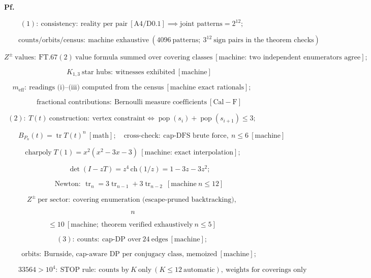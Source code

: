 \begin{theorem}
\textbf{Pf.}

\[
(1):\ \text{consistency}:\ \text{reality per pair}\ [\mathrm{A4}/\mathrm{D0.1}]\implies\text{joint patterns}=2^{12};
\]

\[
\qquad \text{counts/orbits/census}:\ \text{machine exhaustive}\ (4096\ \text{patterns};\ 3^{12}\ \text{sign pairs in the theorem checks})
\]

\[
Z^{\pm}\ \text{values}:\ \mathrm{FT.67}(2)\ \text{value formula summed over covering classes}\ [\text{machine}:\ \text{two independent enumerators agree}];
\]

\[
\qquad K_{1,3}\ \text{star hubs}:\ \text{witnesses exhibited}\ [\text{machine}]
\]

\[
m_{\mathrm{eff}}:\ \text{readings (i)--(iii) computed from the census}\ [\text{machine exact rationals}];
\]

\[
\qquad \text{fractional contributions}:\ \text{Bernoulli measure coefficients}\ [\mathrm{Cal-F}]
\]

\[
(2):\ T(t)\ \text{construction}:\ \text{vertex constraint}\iff\operatorname{pop}(s_i)+\operatorname{pop}(s_{i+1})\le3;
\]

\[
\qquad B_{P_n}(t)=\operatorname{tr}T(t)^n\ [\text{math}];\quad\text{cross-check}:\ \text{cap-DFS brute force},\ n\le6\ [\text{machine}]
\]

\[
\operatorname{charpoly}T(1)=x^2(x^2-3x-3)\ [\text{machine: exact interpolation}];
\]

\[
\qquad \det(I-zT)=z^4\,\mathrm{ch}(1/z)=1-3z-3z^2;
\]

\[
\qquad \text{Newton}:\ \operatorname{tr}_n=3\operatorname{tr}_{n-1}+3\operatorname{tr}_{n-2}\ [\text{machine}\ n\le12]
\]

\[
Z^{\pm}\ \text{per sector}:\ \text{covering enumeration (escape-pruned backtracking)},
\]

\[
\ n
\]

\[
\le 10\ [\text{machine};\ \text{theorem verified exhaustively}\ n\le5]
\]

\[
(3):\ \text{counts}:\ \text{cap-DP over}\ 24\ \text{edges}\ [\text{machine}];
\]

\[
\qquad \text{orbits}:\ \text{Burnside, cap-aware DP per conjugacy class, memoized}\ [\text{machine}];
\]

\[
\qquad 33564>10^4:\ \text{STOP rule}:\ \text{counts by}\ K\ \text{only}\ (K\le12\ \text{automatic}),\ \text{weights for coverings only}
\]


\end{theorem}
